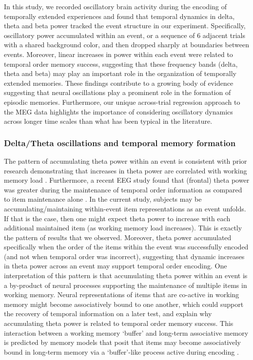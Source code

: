 In this study, we recorded oscillatory brain activity during the
encoding of temporally extended experiences and found that temporal
dynamics in delta, theta and beta power tracked the event structure in
our experiment. Specifically, oscillatory power accumulated within an
event, or a sequence of 6 adjacent trials with a shared background
color, and then dropped sharply at boundaries between events. Moreover,
linear increases in power within each event were related to temporal
order memory success, suggesting that these frequency bands (delta,
theta and beta) may play an important role in the organization of
temporally extended memories. These findings contribute to a growing
body of evidence suggesting that neural oscillations play a prominent
role in the formation of episodic memories. Furthermore, our unique
across-trial regression approach to the MEG data highlights the
importance of considering oscillatory dynamics across longer time scales
than what has been typical in the literature.

\subsubsection{Delta/Theta oscillations and temporal memory
formation}\label{deltatheta-oscillations-and-temporal-memory-formation}

The pattern of accumulating theta power within an event is consistent
with prior research demonstrating that increases in theta power are
correlated with working memory load
\autocites{jensen_frontal_2002}{raghavachari_gating_2001}{raghavachari_theta_2006}{hsieh_neural_2011}{scheeringa_trial-by-trial_2009}{gevins_high-resolution_1997}.
Furthermore, a recent EEG study found that (frontal) theta power was
greater during the maintenance of temporal order information as compared
to item maintenance alone \autocite{hsieh_neural_2011}. In the current
study, subjects may be accumulating/maintaining within-event item
representations as an event unfolds. If that is the case, then one might
expect theta power to increase with each additional maintained item (as
working memory load increases). This is exactly the pattern of results
that we observed. Moreover, theta power accumulated specifically when
the order of the items within the event was successfully encoded (and
not when temporal order was incorrect), suggesting that dynamic
increases in theta power across an event may support temporal order
encoding. One interpretation of this pattern is that accumulating theta
power within an event is a by-product of neural processes supporting the
maintenance of multiple items in working memory. Neural representations
of items that are co-active in working memory might become associatively
bound to one another, which could support the recovery of temporal
information on a later test, and explain why accumulating theta power is
related to temporal order memory success. This interaction between a
working memory `buffer' and long-term associative memory is predicted by
memory models that posit that items may become associatively bound in
long-term memory via a `buffer'-like process active during encoding
\autocite{lehman_buffer_2013}.


